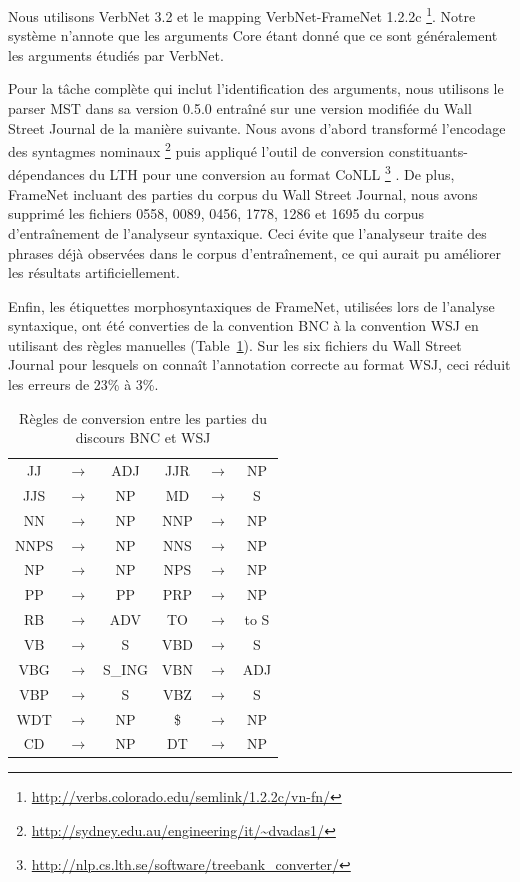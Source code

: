 Nous utilisons VerbNet 3.2 et le mapping VerbNet-FrameNet 1.2.2c
\footnote{\url{http://verbs.colorado.edu/semlink/1.2.2c/vn-fn/}}. Notre système
n'annote que les arguments Core étant donné que ce sont généralement les
arguments étudiés par VerbNet.

Pour la tâche complète qui inclut l'identification des arguments, nous
utilisons le parser MST dans sa version 0.5.0 \citep{mcdonald2006multilingual}
entraîné sur une version modifiée du Wall Street Journal de la manière
suivante. Nous avons d'abord transformé l'encodage des syntagmes nominaux
\footnote{\url{http://sydney.edu.au/engineering/it/~dvadas1/}}
\citep{vadas2007adding} puis appliqué l'outil de conversion
constituants-dépendances du LTH pour une conversion au format CoNLL
\footnote{\url{http://nlp.cs.lth.se/software/treebank_converter/}}
\citep{johansson2007extended}. De plus, FrameNet incluant des parties du corpus
du Wall Street Journal, nous avons supprimé les fichiers 0558, 0089, 0456,
1778, 1286 et 1695 du corpus d'entraînement de l'analyseur syntaxique. Ceci
évite que l'analyseur traite des phrases déjà observées dans le corpus
d'entraînement, ce qui aurait pu améliorer les résultats artificiellement.

Enfin, les étiquettes morphosyntaxiques de FrameNet, utilisées lors de
l'analyse syntaxique, ont été converties de la convention BNC à la convention
WSJ en utilisant des règles manuelles (Table~\ref{table:tagset_rules}). Sur les
six fichiers du Wall Street Journal pour lesquels on connaît l'annotation
correcte au format WSJ, ceci réduit les erreurs de 23\% à 3\%.

\begin{table}[ht]
    \centering
    \begin{tabular}{ccc|ccc}
        \toprule
        JJ   &$\to$& ADJ    & JJR  &$\to$& NP     \\
        JJS  &$\to$& NP     & MD   &$\to$& S      \\
        NN   &$\to$& NP     & NNP  &$\to$& NP     \\
        NNPS &$\to$& NP     & NNS  &$\to$& NP     \\
        NP   &$\to$& NP     & NPS  &$\to$& NP     \\
        PP   &$\to$& PP     & PRP  &$\to$& NP     \\  
        RB   &$\to$& ADV    & TO   &$\to$& to S   \\
        VB   &$\to$& S      & VBD  &$\to$& S      \\
        VBG  &$\to$& S\_ING & VBN  &$\to$& ADJ    \\
        VBP  &$\to$& S      & VBZ  &$\to$& S      \\
        WDT  &$\to$& NP     & \$   &$\to$& NP     \\  
        CD   &$\to$& NP     & DT   &$\to$& NP     \\
        \bottomrule
    \end{tabular}
    \caption{\protect\centering\label{table:tagset_rules}Règles de conversion entre les parties du discours BNC et WSJ}
\end{table}

